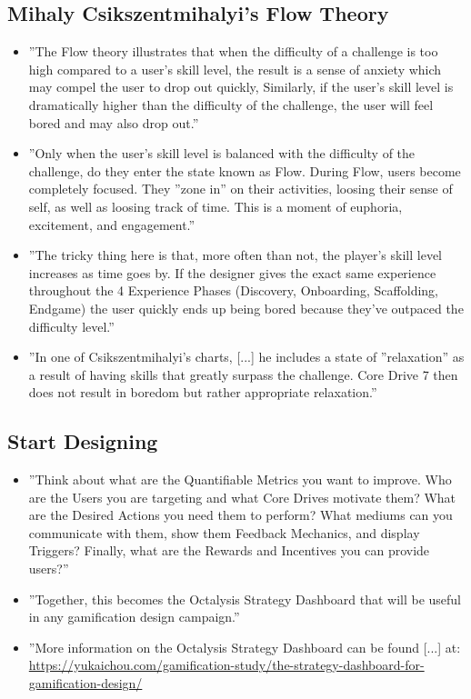 \subsection{Mihaly Csikszentmihalyi's Flow Theory}
\begin{itemize}
    \item ''The Flow theory illustrates that when the difficulty of a challenge is too high compared to a user's skill level, the result is a sense of anxiety which may compel the user to drop out quickly, Similarly, if the user's skill level is dramatically higher than the difficulty of the challenge, the user will feel bored and may also drop out.''
    \item ''Only when the user's skill level is balanced with the difficulty of the challenge, do they enter the state known as Flow. During Flow, users become completely focused. They ''zone in'' on their activities, loosing their sense of self, as well as loosing track of time. This is a moment of euphoria, excitement, and engagement.''
    \item ''The tricky thing here is that, more often than not, the player's skill level increases as time goes by. If the designer gives the exact same experience throughout the 4 Experience Phases (Discovery, Onboarding, Scaffolding, Endgame) the user quickly ends up being bored because they've outpaced the difficulty level.''
    \item ''In one of Csikszentmihalyi's charts, [...] he includes a state of ''relaxation'' as a result of having skills that greatly surpass the challenge. Core Drive 7 then does not result in boredom but rather appropriate relaxation.''
\end{itemize}

\subsection{Start Designing}
\begin{itemize}
    \item ''Think about what are the Quantifiable Metrics you want to improve. Who are the Users you are targeting and what Core Drives motivate them? What are the Desired Actions you need them to perform? What mediums can you communicate with them, show them Feedback Mechanics, and display Triggers? Finally, what are the Rewards and Incentives you can provide users?''
    \item ''Together, this becomes the Octalysis Strategy Dashboard that will be useful in any gamification design campaign.''
    \item ''More information on the Octalysis Strategy Dashboard can be found [...] at: \url{https://yukaichou.com/gamification-study/the-strategy-dashboard-for-gamification-design/}
\end{itemize}